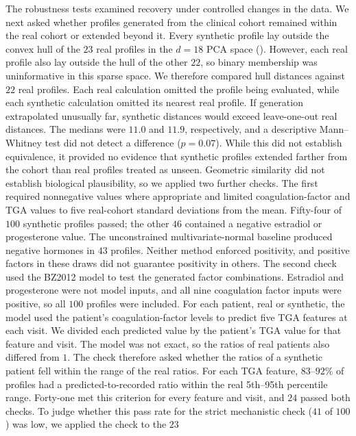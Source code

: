 The robustness tests examined recovery under controlled changes in the data. We next
asked whether profiles generated from the clinical cohort remained within the real cohort or
extended beyond it. Every synthetic profile lay outside the convex hull of the $23$ real profiles in the
$d{=}18$ PCA space (). However, each real profile
also lay outside the hull of the other $22$, so binary membership was uninformative in this
sparse space. We therefore compared hull distances against $22$ real profiles. Each real
calculation omitted the profile being evaluated, while each synthetic calculation omitted its
nearest real profile. If generation extrapolated unusually far, synthetic distances would
exceed leave-one-out real distances. The medians were $11.0$ and $11.9$, respectively, and a
descriptive Mann--Whitney test did not detect a difference ($p{=}0.07$). While this did not establish
equivalence, it provided no evidence that synthetic profiles extended farther from the
cohort than real profiles treated as unseen. Geometric similarity did not establish biological
plausibility, so we applied two further checks. The first required nonnegative values where
appropriate and limited coagulation-factor and TGA values to five real-cohort standard
deviations from the mean. Fifty-four of $100$ synthetic
profiles passed; the other $46$ contained a negative estradiol or progesterone value. The
unconstrained multivariate-normal baseline produced negative hormones in $43$ profiles.
Neither method enforced positivity, and positive factors in these draws did not guarantee
positivity in others. The second check used the BZ2012 model to test the generated factor combinations.
Estradiol and progesterone were not model inputs, and all nine coagulation factor inputs were positive, so
all $100$ profiles were included. For each patient, real or synthetic,
the model used the patient's coagulation-factor levels to predict five TGA features at each
visit. We divided each predicted value by the patient's TGA value for that feature and visit.
The model was not exact, so the ratios of real patients also differed from $1$. The check
therefore asked whether the ratios of a synthetic patient fell within the range of the real
ratios. For each TGA feature, $83$--$92\%$ of profiles had a
predicted-to-recorded ratio within the real 5th--95th percentile range. Forty-one met this
criterion for every feature and visit, and $24$ passed both checks. To judge whether this pass
rate for the strict mechanistic check ($41$ of $100$) was low, we applied the check to the $23$
